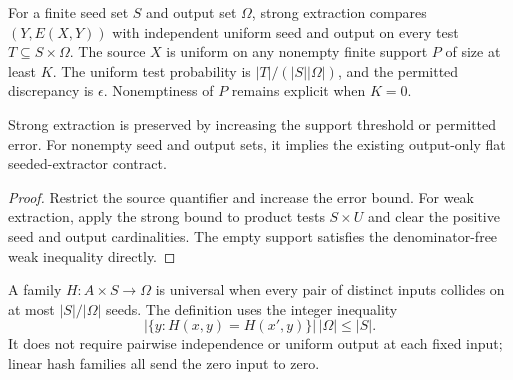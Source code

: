 \begin{definition}
  \label{def:lowerbounds-algebraic-strong-extractor}
  \leanok
  For a finite seed set $S$ and output set $\Omega$, strong extraction
  compares $(Y,E(X,Y))$ with independent uniform seed and output on every
  test $T\subseteq S\times\Omega$. The source $X$ is uniform on any
  nonempty finite support $P$ of size at least $K$. The uniform test
  probability is $|T|/(|S||\Omega|)$, and the permitted discrepancy is
  $\epsilon$. Nonemptiness of $P$ remains explicit when $K=0$.
\end{definition}

\begin{theorem}
  \label{thm:lowerbounds-algebraic-strong-extractor-forget}
  \leanok
  Strong extraction is preserved by increasing the support threshold or
  permitted error. For nonempty seed and output sets, it implies the
  existing output-only flat seeded-extractor contract.
\end{theorem}
\begin{proof}
  \leanok
  Restrict the source quantifier and increase the error bound. For weak
  extraction, apply the strong bound to product tests $S\times U$ and
  clear the positive seed and output cardinalities. The empty support
  satisfies the denominator-free weak inequality directly.
\end{proof}

\begin{definition}
  \label{def:lowerbounds-algebraic-universal-hashing}
  \leanok
  A family $H:A\times S\to\Omega$ is universal when every pair of
  distinct inputs collides on at most $|S|/|\Omega|$ seeds. The definition
  uses the integer inequality
  \[
    |\{y:H(x,y)=H(x',y)\}|\,|\Omega|\le |S|.
  \]
  It does not require pairwise independence or uniform output at each
  fixed input; linear hash families all send the zero input to zero.
\end{definition}

